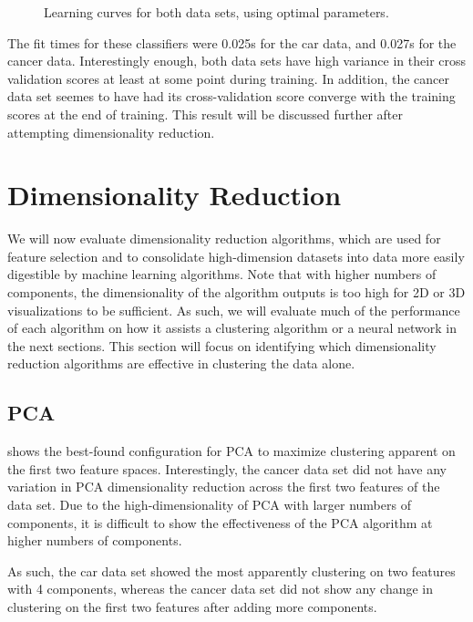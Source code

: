 \documentclass{article}
\begin{document}
\begin{figure}[htb]
        \caption{Learning curves for both data sets, using optimal parameters.}
        \label{fig:em-learning}
        \end{figure}

        The fit times for these classifiers were 0.025s for the car data, and 0.027s for the cancer data. Interestingly enough, both data sets have high variance in their cross validation scores at least at some point during training. In addition, the cancer data set seemes to have had its cross-validation score converge with the training scores at the end of training. This result will be discussed further after attempting dimensionality reduction.

  \section{Dimensionality Reduction}
    We will now evaluate dimensionality reduction algorithms, which are used for feature selection and to consolidate high-dimension datasets into data more easily digestible by machine learning algorithms. Note that with higher numbers of components, the dimensionality of the algorithm outputs is too high for 2D or 3D visualizations to be sufficient. As such, we will evaluate much of the performance of each algorithm on how it assists a clustering algorithm or a neural network in the next sections. This section will focus on identifying which dimensionality reduction algorithms are effective in clustering the data alone. 

    \subsection{PCA}
       shows the best-found configuration for PCA to maximize clustering apparent on the first two feature spaces. Interestingly, the cancer data set did not have any variation in PCA dimensionality reduction across the first two features of the data set. Due to the high-dimensionality of PCA with larger numbers of components, it is difficult to show the effectiveness of the PCA algorithm at higher numbers of components.

      As such, the car data set showed the most apparently clustering on two features with 4 components, whereas the cancer data set did not show any change in clustering on the first two features after adding more components.
\end{document}
